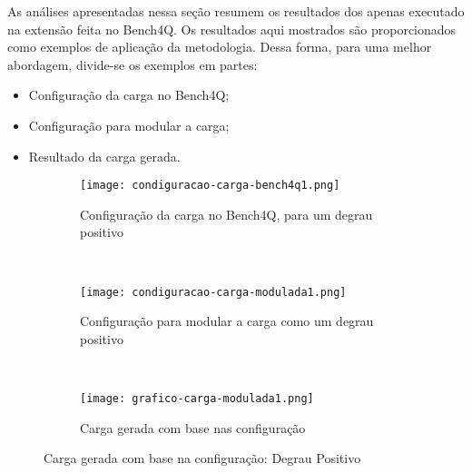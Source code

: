 As análises apresentadas nessa seção resumem os resultados dos apenas executado na extensão feita no Bench4Q. Os resultados aqui mostrados são proporcionados como exemplos de aplicação da metodologia. Dessa forma, para uma melhor abordagem, divide-se os exemplos em  partes:
\begin{itemize}
	\item Configuração da carga no Bench4Q;
	\item Configuração para modular a carga;
	\item Resultado da carga gerada.
\end{itemize}

\begin{figure}[!htb]
	\begin{subfigure}{\linewidth}
		\centering
		\texttt{[image: condiguracao-carga-bench4q1.png]}
		\caption{Configuração da carga no Bench4Q, para um degrau positivo}
		\label{fig:condiguracao-carga-bench4q1}
	\end{subfigure}\\
	\begin{subfigure}{\linewidth}
		\centering
		\texttt{[image: condiguracao-carga-modulada1.png]}
		\caption{Configuração para modular a carga como um degrau positivo}
		\label{fig:condiguracao-carga-modulada1}
	\end{subfigure}\\[1ex]
	\begin{subfigure}{\linewidth}
		\centering
		\texttt{[image: grafico-carga-modulada1.png]}
		\caption{Carga gerada com base nas configuração}
		\label{fig:grafico-carga-modulada1}
	\end{subfigure}
	\caption{Carga gerada com base na configuração: Degrau Positivo}
	\label{fig:carga-modulada1}
	\fautor
\end{figure}

